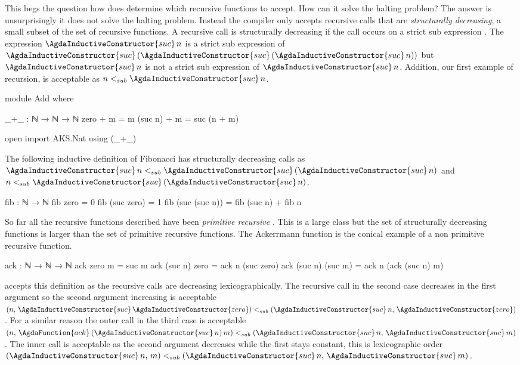 \documentclass[./Thesis.tex]{subfiles}
\begin{document}
This begs the question how does \Agda{} determine which recursive functions to
accept. How can it solve the halting problem? The answer is unsurprisingly it
does not solve the halting problem. Instead the compiler only accepts recursive
calls that are \textit{structurally decreasing}, a small
subset of the set of recursive functions. A recursive call is structurally
decreasing if the call occurs on a strict sub expression \cite{agda}. The
expression $\AgdaInductiveConstructor{suc} \, n$ is a strict sub expression of
$\AgdaInductiveConstructor{suc} \,
  (\AgdaInductiveConstructor{suc} \,
    (\AgdaInductiveConstructor{suc} \, n))
$
but $\AgdaInductiveConstructor{suc} \, n$ is not a strict sub expression of
$\AgdaInductiveConstructor{suc} \, n$.
Addition, our first example of recursion, is acceptable as
$n <_{sub} \AgdaInductiveConstructor{suc} \, n$.
\begin{code}[hide]
  module Add where
\end{code}
\begin{code}
    _+_ : ℕ → ℕ → ℕ
    zero + m = m
    (suc n) + m = suc (n + m)
\end{code}
\begin{code}[hide]
  open import AKS.Nat using (_+_)
\end{code}
The following inductive definition of Fibonacci
has structurally decreasing calls as
$\AgdaInductiveConstructor{suc} \, n <_{sub} \AgdaInductiveConstructor{suc} \, (\AgdaInductiveConstructor{suc} \, n)$
and
$n <_{sub} \AgdaInductiveConstructor{suc} \, (\AgdaInductiveConstructor{suc} \, n)$.
\begin{code}
  fib : ℕ → ℕ
  fib zero = 0
  fib (suc zero) = 1
  fib (suc (suc n)) = fib (suc n) + fib n
\end{code}
So far all the recursive functions described have been
\textit{primitive recursive} \cite{soare}. This is a large class but the set of
structurally decreasing functions is larger than the set of primitive
recursive functions. The Ackerrmann function is the conical example of a non
primitive recursive function. \begin{code}
  ack : ℕ → ℕ → ℕ
  ack zero m = suc m
  ack (suc n) zero = ack n (suc zero)
  ack (suc n) (suc m) = ack n (ack (suc n) m)
\end{code}
\Agda{} accepts this definition as the recursive
calls are decreasing lexicographically.
The recursive call in the second case decreases in the first argument so
the second argument increasing is acceptable
$
(n, \, \AgdaInductiveConstructor{suc} \, \AgdaInductiveConstructor{zero})
<_{sub}
(\AgdaInductiveConstructor{suc} \, n, \, \AgdaInductiveConstructor{zero})
$.
For a similar reason the outer call in the third case is acceptable
$
(n, \, \AgdaFunction{ack} \, (\AgdaInductiveConstructor{suc} \, n) \, m)
<_{sub}
(\AgdaInductiveConstructor{suc} \, n, \, \AgdaInductiveConstructor{suc} \, m)
$.
The inner call is acceptable as the second argument decreases while the first
stays constant, this is lexicographic order
$
(\AgdaInductiveConstructor{suc} \, n, \, m)
<_{sub}
(\AgdaInductiveConstructor{suc} \, n, \, \AgdaInductiveConstructor{suc} \, m)
$. \\
\end{document}
